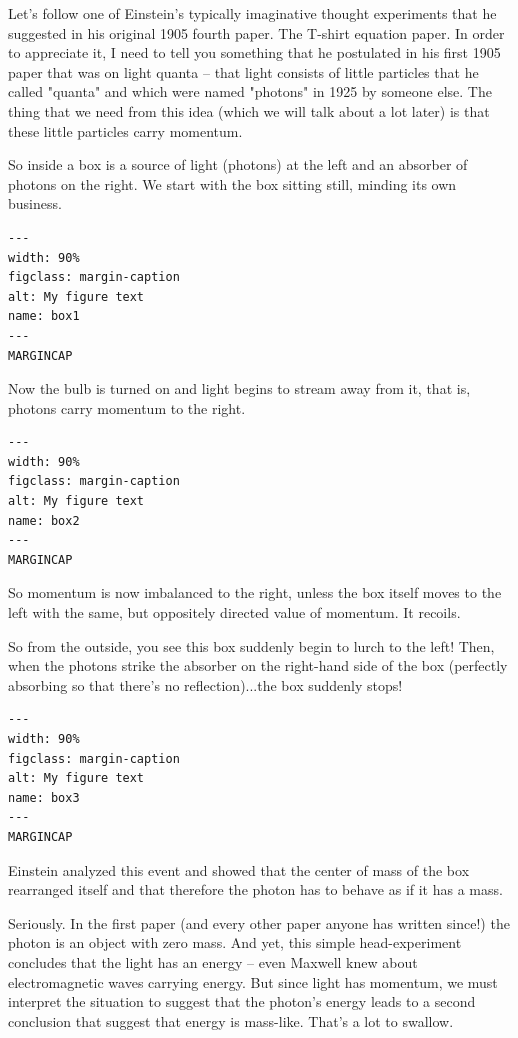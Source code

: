 \documentclass[
]{article}
\begin{document}
Let's follow one of Einstein's typically imaginative thought experiments
that he suggested in his original 1905 fourth paper. The T-shirt
equation paper. In order to appreciate it, I need to tell you something
that he postulated in his first 1905 paper that was on light quanta --
that light consists of little particles that he called "quanta" and
which were named "photons" in 1925 by someone else. The thing that we
need from this idea (which we will talk about a lot later) is that these
little particles carry momentum.

So inside a box is a source of light (photons) at the left and an
absorber of photons on the right. We start with the box sitting still,
minding its own business.

\begin{verbatim}
---
width: 90%
figclass: margin-caption
alt: My figure text
name: box1
---
MARGINCAP
\end{verbatim}

Now the bulb is turned on and light begins to stream away from it, that
is, photons carry momentum to the right.

\begin{verbatim}
---
width: 90%
figclass: margin-caption
alt: My figure text
name: box2
---
MARGINCAP
\end{verbatim}

So momentum is now imbalanced to the right, unless the box itself moves
to the left with the same, but oppositely directed value of momentum. It
recoils.

So from the outside, you see this box suddenly begin to lurch to the
left! Then, when the photons strike the absorber on the right-hand side
of the box (perfectly absorbing so that there's no reflection)...the box
suddenly stops!

\begin{verbatim}
---
width: 90%
figclass: margin-caption
alt: My figure text
name: box3
---
MARGINCAP
\end{verbatim}

Einstein analyzed this event and showed that the center of mass of the
box rearranged itself and that therefore the photon has to behave as if
it has a mass.

Seriously. In the first paper (and every other paper anyone has written
since!) the photon is an object with zero mass. And yet, this simple
head-experiment concludes that the light has an energy -- even Maxwell
knew about electromagnetic waves carrying energy. But since light has
momentum, we must interpret the situation to suggest that the photon's
energy leads to a second conclusion that suggest that energy is
mass-like. That's a lot to swallow.
\end{document}
